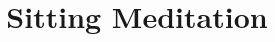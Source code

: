 
\graphicspath{{../../../images/Exercises/}} %


\title{Sitting Meditation} %



\begin{frame}
\titlepage %
\end{frame}









 
